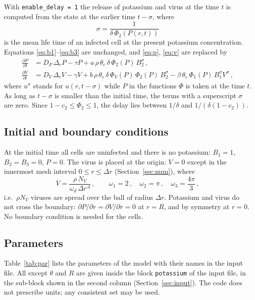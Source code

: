 \documentclass[11pt]{article}
\newcommand{\code}[1]{\texttt{#1}}
\newcommand{\pp}[2]{\frac{\partial #1}{\partial #2}}
\newcommand{\pph}[1]{\partial #1/\partial r}
\newcommand{\Dr}{\Delta r}
\newcommand{\thetae}{\theta_e}
\begin{document}
With \code{enable\_delay = 1} the release of potassium and virus at the time $t$ is computed from the state at the earlier time $t-\sigma$, where
\begin{equation}
  \sigma = \frac{1}{\delta\,\Phi_2(P(r,t))}
  \label{eq:sigma}
\end{equation}
is the mean life time of an infected cell at the present potassium concentration.
Equations \eqref{eq:b1}--\eqref{eq:b3} are unchanged, and \eqref{eq:p}, \eqref{eq:v} are replaced by
\begin{align}
  \pp{P}{t} &= D_P\,\Delta_rP - \tau P + a\,\rho\,\thetae\,\delta\,\Phi_2(P)\,B_2^\sigma\,, \label{eq:pd}\\
  \pp{V}{t} &= D_V\,\Delta_rV - \gamma V + b\,\rho\,\thetae\,\delta\,\Phi_V(P)\,\Phi_2(P)\,B_2^\sigma - \beta\,\thetae\,\Phi_1(P)\,B_1^\sigma V^\sigma\,, \label{eq:vd}
\end{align}
where $u^\sigma$ stands for $u(r,t-\sigma)$ while $P$ in the functions $\Phi$ is taken at the time $t$.
As long as $t-\sigma$ is smaller than the initial time, the terms with a superscript $\sigma$ are zero.
Since $1-c_2\le\Phi_2\le1$, the delay lies between $1/\delta$ and $1/(\delta(1-c_2))$.

\subsection{Initial and boundary conditions}
At the initial time all cells are uninfected and there is no potassium:
$B_1=1$, $B_2=B_3=0$, $P=0$.
The virus is placed at the origin: $V=0$ except in the innermost mesh interval $0\le r\le\Dr$ (Section~\ref{sec:num}), where
\begin{equation}
  V = \frac{\rho\,N_V}{\omega_d\,\Dr^{\,d}}\,,\qquad \omega_1=2\,,\quad \omega_2=\pi\,,\quad \omega_3=\frac{4\pi}{3}\,,
  \label{eq:ic}
\end{equation}
i.e.\ $\rho N_V$ viruses are spread over the ball of radius $\Dr$.
Potassium and virus do not cross the boundary: $\pph{P}=\pph{V}=0$ at $r=R$, and by symmetry at $r=0$.
No boundary condition is needed for the cells.

\subsection{Parameters}
\label{sec:par}
Table~\ref{tab:par} lists the parameters of the model with their names in the input file.
All except $\theta$ and $R$ are given inside the block \code{potassium} of the input file, in the sub-block shown in the second column (Section~\ref{sec:input}).
The code does not prescribe units; any consistent set may be used.
\end{document}
